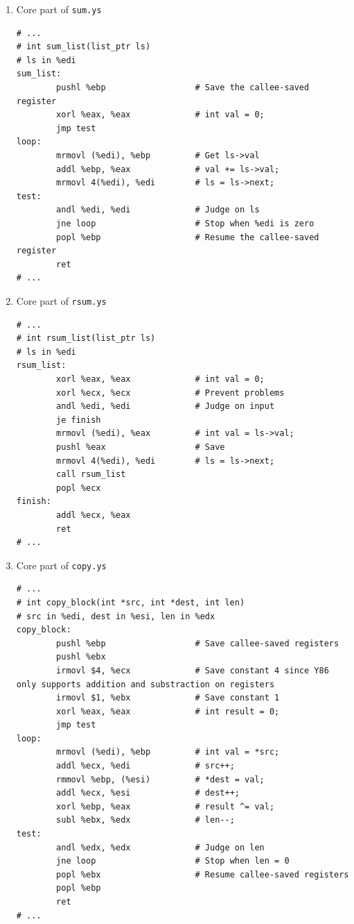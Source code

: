 \documentclass{article}
\begin{document}
\begin{enumerate}
    \item Core part of \lstinline{sum.ys}
    \begin{lstlisting}
# ...
# int sum_list(list_ptr ls)
# ls in %edi
sum_list:
        pushl %ebp                  # Save the callee-saved register
        xorl %eax, %eax             # int val = 0;
        jmp test
loop:
        mrmovl (%edi), %ebp         # Get ls->val
        addl %ebp, %eax             # val += ls->val;
        mrmovl 4(%edi), %edi        # ls = ls->next;          
test:
        andl %edi, %edi             # Judge on ls
        jne loop                    # Stop when %edi is zero
        popl %ebp                   # Resume the callee-saved register
        ret
# ...
    \end{lstlisting}
    \item Core part of \lstinline{rsum.ys}
    \begin{lstlisting}
# ...
# int rsum_list(list_ptr ls)
# ls in %edi
rsum_list:
        xorl %eax, %eax             # int val = 0;
        xorl %ecx, %ecx             # Prevent problems
        andl %edi, %edi             # Judge on input
        je finish
        mrmovl (%edi), %eax         # int val = ls->val;
        pushl %eax                  # Save
        mrmovl 4(%edi), %edi        # ls = ls->next;
        call rsum_list
        popl %ecx
finish:
        addl %ecx, %eax
        ret
# ...
    \end{lstlisting}
    \item Core part of \lstinline{copy.ys}
\begin{lstlisting}
# ...
# int copy_block(int *src, int *dest, int len)
# src in %edi, dest in %esi, len in %edx
copy_block:
        pushl %ebp                  # Save callee-saved registers
        pushl %ebx
        irmovl $4, %ecx             # Save constant 4 since Y86 only supports addition and substraction on registers
        irmovl $1, %ebx             # Save constant 1
        xorl %eax, %eax             # int result = 0;
        jmp test
loop:
        mrmovl (%edi), %ebp         # int val = *src;
        addl %ecx, %edi             # src++;
        rmmovl %ebp, (%esi)         # *dest = val;
        addl %ecx, %esi             # dest++;
        xorl %ebp, %eax             # result ^= val;
        subl %ebx, %edx             # len--;
test:
        andl %edx, %edx             # Judge on len
        jne loop                    # Stop when len = 0
        popl %ebx                   # Resume callee-saved registers
        popl %ebp
        ret
# ...
    \end{lstlisting}
\end{enumerate}
\end{document}
